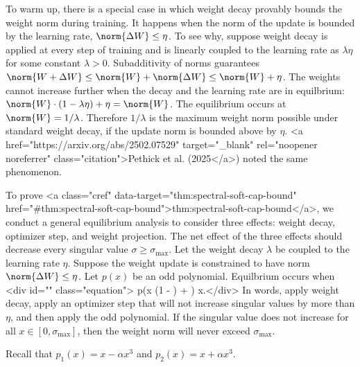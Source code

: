 To warm up, there is a special case in which weight decay provably bounds the weight norm during training. It happens when the norm of the update is bounded by the learning rate, $\norm{\Delta W} \leq \eta$. To see why, suppose weight decay is applied at every step of training and is linearly coupled to the learning rate as $\lambda \eta$ for some constant $\lambda > 0$. Subadditivity of norms guarantees $\norm{W + \Delta W} \leq \norm{W} + \norm{\Delta W} \leq \norm{W} + \eta$. The weights cannot increase further when the decay and the learning rate are in equilbrium: $\norm{W} \cdot (1 - \lambda \eta) + \eta = \norm{W}$. The equilibrium occurs at $\norm{W} = 1/\lambda$. Therefore $1/\lambda$ is the maximum weight norm possible under standard weight decay, if the update norm is bounded above by $\eta$. <a href="https://arxiv.org/abs/2502.07529" target="_blank" rel="noopener noreferrer" class="citation">Pethick et al. (2025</a>) noted the same phenomenon.

To prove <a class="cref" data-target="thm:spectral-soft-cap-bound" href="#thm:spectral-soft-cap-bound">thm:spectral-soft-cap-bound</a>, we conduct a general equilibrium analysis to consider three effects: weight decay, optimizer step, and weight projection. The net effect of the three effects should decrease every singular value $\sigma \geq \sigma_\text{max}$. Let the weight decay $\lambda$ be coupled to the learning rate $\eta$. Suppose the weight update is constrained to have norm $\norm{\Delta W} \leq \eta$. Let $p(x)$ be an odd polynomial. Equilbrium occurs when <div id="" class="equation">    \label{eq:equilibrium}
    p(x \cdot (1 - \lambda \eta) + \eta) \leq x.</div> In words, apply weight decay, apply an optimizer step that will not increase singular values by more than $\eta$, and then apply the odd polynomial. If the singular value does not increase for all $x \in [0, \sigma_\text{max}]$, then the weight norm will never exceed $\sigma_\text{max}$.

Recall that $p_1(x) = x - \alpha x^3$ and $p_2(x) = x + \alpha x^3$.

